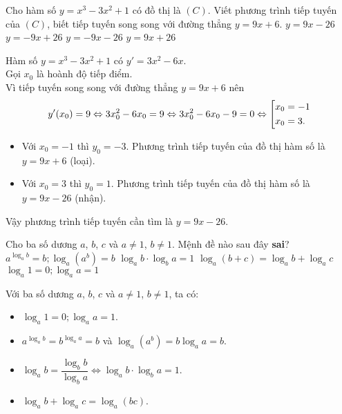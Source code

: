 \begin{ex}%
 Cho hàm số $y = x^3 - 3x^2 + 1$ có đồ thị là $(C)$. Viết phương trình tiếp tuyến của $(C)$, biết tiếp tuyến song song với đường thẳng $y = 9x + 6$.
 \choice
  {\True $y = 9x - 26$}
  {$y = -9x + 26$}
  {$y = -9x - 26$}
  {$y = 9x + 26$}
 \loigiai
  {
  Hàm số $y = x^3 - 3x^2 + 1$ có $y' = 3x^2 - 6x$.\\
  Gọi $x_0$ là hoành độ tiếp điểm.\\
  Vì tiếp tuyến song song với đường thẳng $y = 9x + 6$ nên
  \begin{eqnarray*}
   y'(x_0) = 9 \Leftrightarrow 3x_0^2 - 6x_0 = 9 \Leftrightarrow 3x_0^2 - 6x_0 - 9 = 0 \Leftrightarrow \left[\begin{aligned}& x_0 = -1 \\& x_0 = 3.\end{aligned}\right.
  \end{eqnarray*}
  \begin{itemize}
   \item Với $x_0 = - 1$ thì $y_0 = -3$. Phương trình tiếp tuyến của đồ thị hàm số là $y = 9x + 6$ (loại).
   \item Với $x_0 = 3$ thì $y_0 = 1$. Phương trình tiếp tuyến của đồ thị hàm số là $y = 9x - 26$ (nhận).
  \end{itemize}
  Vậy phương trình tiếp tuyến cần tìm là $y=9x-26$.
  }
\end{ex}

\begin{ex}%
 Cho ba số dương $a$, $b$, $c$ và $a \neq 1$, $b \neq 1$. Mệnh đề nào sau đây \textbf{sai}?
 \choice
  {$a^{\log_a b} = b; \log_a (a^b) = b$}
  {$\log_a b \cdot \log_b a = 1$}
  {\True $\log_a (b + c) = \log_a b + \log_a c$}
  {$\log_a 1 = 0; \log_a a = 1$}
 \loigiai
  {
  Với ba số dương $a$, $b$, $c$ và $a \neq 1$, $b \neq 1$, ta có:
   \begin{itemize}
   	\item $\log_a 1 = 0; \log_a a = 1$.
   	\item $a^{\log_a b} = b^{\log_a a} = b$ và $\log_a (a^b) = b \log_ a a = b$.
   	\item $\log_a b = \dfrac{\log_b b}{\log_b a} \Leftrightarrow \log_a b \cdot \log_b a = 1$.
   	\item $\log_a b + \log_a c = \log_a (bc)$.
   \end{itemize}
  }
\end{ex}

